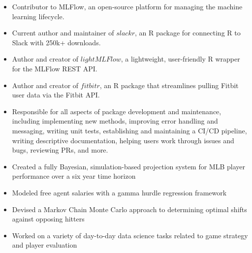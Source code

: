 \documentclass[10pt,a4paper,ragged2e,withhyper]{/Users/matt/documents/GitHub/mrkaye97.github.io/resume/altacv}
\begin{document}
		\begin{itemize}
		\item Contributor to MLFlow,  an open-source platform for managing the machine learning lifecycle.
		\item Current author and maintainer of $slackr$, an R package for connecting R to Slack with 250k+ downloads.
		\item Author and creator of $lightMLFlow$, a lightweight, user-friendly R wrapper for the MLFlow REST API.
		\item Author and creator of $fitbitr$, an R package that streamlines pulling Fitbit user data via the Fitbit API.
		\item Responsible for all aspects of package development and maintenance, including implementing new methods, improving error handling and messaging, writing unit tests, establishing and maintaining a CI/CD pipeline, writing descriptive documentation, helping users work through issues and bugs, reviewing PRs, and more.
		\end{itemize}
		
		\divider

		\begin{itemize}
		\item Created a fully Bayesian, simulation-based projection system for MLB player performance over a six year time horizon
		\item Modeled free agent salaries with a gamma hurdle regression framework
		\item Devised a Markov Chain Monte Carlo approach to determining optimal shifts against opposing hitters
		\item Worked on a variety of day-to-day data science tasks related to game strategy and player evaluation
		\end{itemize}
\end{document}
